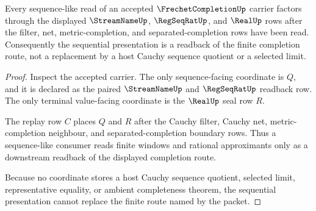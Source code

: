 \begin{theorem}\label{thm:frechet-completion-sequential-readback}
Every sequence-like read of an accepted $\FrechetCompletionUp$ carrier factors through the displayed $\StreamNameUp$, $\RegSeqRatUp$, and $\RealUp$ rows after the filter, net, metric-completion, and separated-completion rows have been read. Consequently the sequential presentation is a readback of the finite completion route, not a replacement by a host Cauchy sequence quotient or a selected limit.
\end{theorem}
\begin{proof}
Inspect the accepted carrier. The only sequence-facing coordinate is $Q$, and it is declared as the paired $\StreamNameUp$ and $\RegSeqRatUp$ readback row. The only terminal value-facing coordinate is the $\RealUp$ seal row $R$.

The replay row $C$ places $Q$ and $R$ after the Cauchy filter, Cauchy net, metric-completion neighbour, and separated-completion boundary rows. Thus a sequence-like consumer reads finite windows and rational approximants only as a downstream readback of the displayed completion route.

Because no coordinate stores a host Cauchy sequence quotient, selected limit, representative equality, or ambient completeness theorem, the sequential presentation cannot replace the finite route named by the packet.
\end{proof}


\begin{closurestatus}{\FrechetCompletionUp}
  \theoryclosure{\seedClosure}
  \formalstatus{\unformalizedV}
\end{closurestatus}
